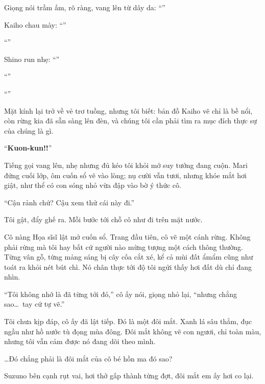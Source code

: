 \documentclass[../main.tex]{subfiles}
\begin{document}
Giọng nói trầm ấm, rõ ràng, vang lên từ dây da: ``''

Kaiho chau mày: ``''

``''

Shino run nhẹ: ``''

``''

``''

Mặt kính lại trở về vẻ trơ tuồng, nhưng tôi biết: bản đồ Kaiho vẽ chỉ là bề nổi, còn rừng kia đã sẵn sàng lên đèn, và chúng tôi cần phải tìm ra mục đích thực sự của chúng là gì.

``\textbf{Kuon-kun!!}''

Tiếng gọi vang lên, nhẹ nhưng đủ kéo tôi khỏi mớ suy tưởng đang cuộn. Mari đứng cuối lớp, ôm cuốn sổ vẽ vào lòng; nụ cười vẫn tươi, nhưng khóe mắt hơi giật, như thể có con sóng nhỏ vừa đập vào bờ ý thức cô.

``Cậu rảnh chứ? Cậu xem thử cái này đi.''

Tôi gật, đẩy ghế ra. Mỗi bước tới chỗ cô như đi trên mặt nước.

Cô nàng Họa sĩsĩ lật mở cuốn sổ. Trang đầu tiên, cô vẽ một cánh rừng. Không phải rừng mà tôi hay bất cứ người nào mừng tượng một cách thông thường. Từng vân gỗ, từng mảng sáng bị cây cốa cắt xé, kể cả mùi đất ẩmẩm cũng như toát ra khỏi nét bút chì. Nó chân thực tới độ tôi ngửi thấy hơi đất dù chỉ đang nhìn.

``Tôi không nhớ là đã từng tới đó,'' cô ấy nói, giọng nhỏ lại, ``nhưng chẳng sao\dots\ tay cứ tự vẽ.''

Tôi chưa kịp đáp, cô ấy đã lật tiếp. Đó là một đôi mắt. Xanh lá sâu thẳm, đục ngầu như hồ nước tù đọng mùa đông. Đôi mắt không vẽ con ngươi, chỉ toàn màu, nhưng tôi vẫn cảm được nó đang dõi theo mình.

\dots Đó chẳng phải là đôi mắt của cô bé hồn ma đó sao?

Suzuno bên cạnh rụt vai, hơi thở gấp thành từng đợt, đôi mắt em ấy hơi co lại.
\end{document}
